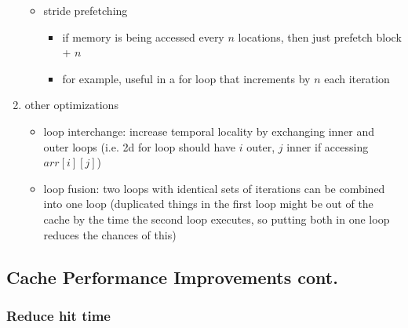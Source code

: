 \documentclass[12pt]{extarticle}
\begin{document}
\begin{enumerate}
\begin{itemize}
			\item stride prefetching
			\begin{itemize}
				\item if memory is being accessed every $n$ locations, then just prefetch block + $n$
				\item for example, useful in a for loop that increments by $n$ each iteration
			\end{itemize}

		\end{itemize}

		\item other optimizations
		\begin{itemize}
			\item loop interchange: increase temporal locality by exchanging inner and outer loops (i.e. 2d for loop 
			should have $i$ outer, $j$ inner if accessing $arr[i][j]$)
			\item loop fusion: two loops with identical sets of iterations can be combined into one loop (duplicated things 
			in the first loop might be out of the cache by the time the second loop executes, so putting both in one loop 
			reduces the chances of this)
		\end{itemize}
	\end{enumerate}

	\subsection{Cache Performance Improvements cont.}

	\subsubsection{Reduce hit time}
\end{document}
